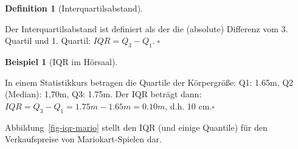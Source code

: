 \documentclass[
  letterpaper,
]{scrbook}
\theoremstyle{definition}
\newtheorem{example}{Beispiel}[chapter]
\theoremstyle{definition}
\newtheorem{definition}{Definition}[chapter]
\theoremstyle{definition}
\theoremstyle{remark}
\begin{document}
\begin{definition}[Interquartilsabstand]\protect\hypertarget{def-iqr}{}\label{def-iqr}

Der Interquartilsabstand ist definiert als der die (absolute) Differenz
vom 3. Quartil und 1. Quartil: \(IQR = Q_3-Q_1. \; \square\)

\end{definition}

\begin{example}[IQR im
Hörsaal]\protect\hypertarget{exm-iqr}{}\label{exm-iqr}

In einem Statistikkurs betragen die Quartile der Körpergröße: Q1: 1.65m,
Q2 (Median): 1,70m, Q3: 1.75m. Der IQR beträgt dann:
\(IQR = Q_3-Q_1 = 1.75m - 1.65m = 0.10m\), d.h. 10 cm.\(\square\)

\end{example}

Abbildung~\ref{fig-iqr-mario} stellt den IQR (und einige Quantile) für
den Verkaufspreise von Mariokart-Spielen dar.
\end{document}
